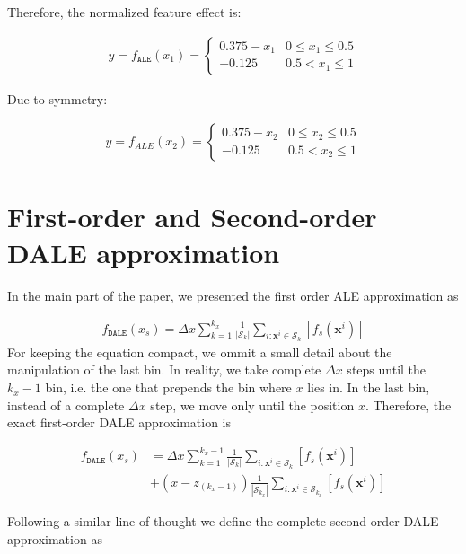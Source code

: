 \documentclass[wcp]{jmlr}
\newcommand{\xb}{\mathbf{x}}
\begin{document}
Therefore, the normalized feature effect is:

\begin{gather}
y = f_{\mathtt{ALE}}(x_1) =
\begin{cases}
0.375 - x_1 & 0 \leq x_1 \leq 0.5\\
- 0.125 &  0.5 < x_1 \leq 1
\end{cases}
\end{gather}

Due to symmetry:

\begin{gather}
y = f_{ALE}(x_2) =
\begin{cases}
0.375 - x_2 & 0 \leq x_2 \leq 0.5\\
- 0.125 &  0.5 < x_2 \leq 1
\end{cases}
\end{gather}

\section{First-order and Second-order DALE approximation}

In the main part of the paper, we presented the first order ALE approximation as

\begin{align}
  f_{\mathtt{DALE}}(x_s) = \Delta x \sum_{k=1}^{k_x} \frac{1}{|\mathcal{S}_k|}
  \sum_{i:\xb^i \in \mathcal{S}_k} [f_s(\xb^i)]
\end{align}
%
For keeping the equation compact, we ommit a small detail about the
manipulation of the last bin. In reality, we take complete
\( \Delta x \) steps until the \( k_x - 1 \) bin, i.e. the one that
prepends the bin where \( x \) lies in. In the last bin, instead of a
complete \( \Delta x \) step, we move only until the position \( x
\). Therefore, the exact first-order DALE approximation is

\begin{equation}
  \begin{split}
  f_{\mathtt{DALE}}(x_s) &= \Delta x \sum_{k=1}^{k_x-1} \frac{1}{|\mathcal{S}_k|}
  \sum_{i:\xb^i \in \mathcal{S}_k} [f_s(\xb^i)]\\
  & + (x-z_{(k_x-1)}) \frac{1}{|\mathcal{S}_{k_x}|} \sum_{i:\xb^i \in
    \mathcal{S}_{k_x}} [f_s(\xb^i)]
  \end{split}
  \label{eq:DALE_first_order_complete}
\end{equation}

\noindent
Following a similar line of thought we define the complete second-order DALE approximation as
\end{document}
